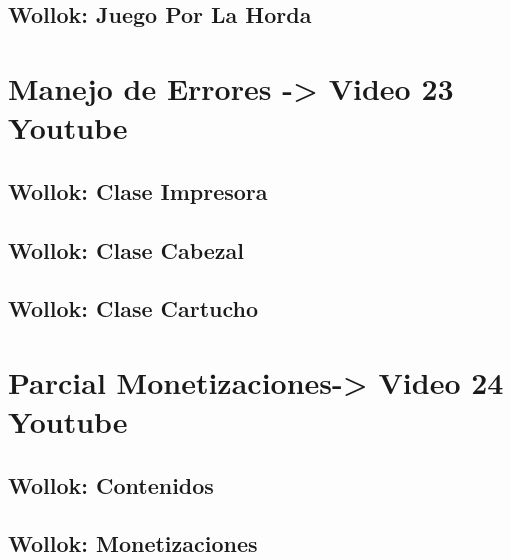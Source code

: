 \documentclass[11pt,a4paper]{article}
\begin{document}
\subsection{Wollok: Juego Por La Horda}


\newpage
\section{Manejo de Errores -> Video 23 Youtube}

\subsection{Wollok: Clase Impresora}


\subsection{Wollok: Clase Cabezal}


\subsection{Wollok: Clase Cartucho}


\newpage
\section{Parcial Monetizaciones-> Video 24 Youtube}

\subsection{Wollok: Contenidos}


\subsection{Wollok: Monetizaciones}

\end{document}

